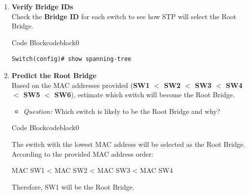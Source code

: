 \documentclass[a4paper]{book}
\begin{document}
\begin{enumerate}
\begin{ocg}{Code Block}{codeblock}{0}
\begin{lstlisting}
\end{lstlisting}

	      \end{ocg}

	\item \textbf{Verify Bridge IDs} \\
	      Check the \textbf{Bridge ID} for each switch to see how STP will select the Root Bridge.



	      \begin{ocg}{Code Block}{codeblock}{0}
		      \vspace{0.5cm}
		      \begin{lstlisting}
Switch(config)# show spanning-tree
\end{lstlisting}

	      \end{ocg}

	\item \textbf{Predict the Root Bridge} \\
	      Based on the MAC addresses provided (\textbf{SW1 $<$ SW2 $<$ SW3 $<$ SW4 $<$ SW5 $<$ SW6}), estimate which switch will become the Root Bridge.
	      \begin{itemize}
		      \item \textit{Question:} Which switch is likely to be the Root Bridge and why?
	      \end{itemize}




	      \begin{ocg}{Code Block}{codeblock}{0}
		      \vspace{0.5cm}
		      \begin{tcolorbox}
			      \small{
				      The switch with the lowest MAC address will be selected as the Root Bridge. According to the provided MAC address order:

				      MAC SW1 < MAC SW2 < MAC SW3 < MAC SW4

				      Therefore, SW1 will be the Root Bridge.
			      }
		      \end{tcolorbox}
	      \end{ocg}


\end{enumerate}
\end{document}
